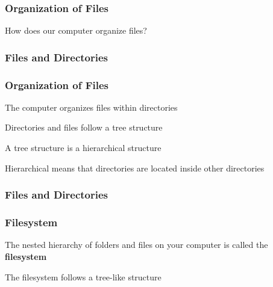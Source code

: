 \documentclass[12pt]{beamer}\usepackage[]{graphicx}\usepackage[]{color}
\begin{document}

\begin{frame}
\frametitle{Organization of Files}

\begin{center}
{\LARGE How does our computer organize files?}
\end{center}

\end{frame}


\begin{frame}[fragile]
\frametitle{Files and Directories}
\begin{center}
\end{center}
\end{frame}


\begin{frame}
\frametitle{Organization of Files}

\bi
  \item The computer organizes files within directories
  \item Directories and files follow a tree structure
  \item A tree structure is a hierarchical structure
  \item Hierarchical means that directories are located inside other directories
\ei

\end{frame}


\begin{frame}[fragile]
\frametitle{Files and Directories}
\begin{center}
\end{center}
\end{frame}


\begin{frame}
\frametitle{Filesystem}

\bbi
  \item The nested hierarchy of folders and files on your computer is called the \textbf{filesystem}
  \item The filesystem follows a tree-like structure
\ei

\end{frame}
\end{document}
